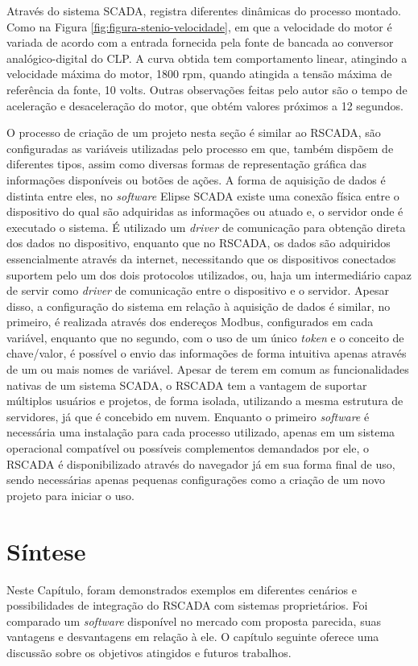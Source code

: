     	
Através do sistema \gls{SCADA},  registra diferentes dinâmicas do processo montado. Como na Figura \ref{fig:figura-stenio-velocidade}, em que a velocidade do motor é variada de acordo com a entrada fornecida pela fonte de bancada ao conversor analógico-digital do \gls{CLP}. A curva obtida tem comportamento linear, atingindo a velocidade máxima do motor,  1800 rpm, quando atingida a tensão máxima de referência da fonte, 10 volts. Outras observações feitas pelo autor são o tempo de aceleração e desaceleração do motor, que obtém valores próximos a 12 segundos.

O processo de criação de um projeto nesta seção é similar ao RSCADA, são configuradas as variáveis utilizadas pelo processo em que, também dispõem de diferentes tipos, assim como diversas formas de representação gráfica das informações disponíveis ou botões de ações. A forma de aquisição de dados é distinta entre eles, no \textit{software} Elipse \gls{SCADA} existe uma conexão física entre o dispositivo do qual são adquiridas as informações ou atuado e, o servidor onde é executado o sistema. É utilizado um \textit{driver} de comunicação para obtenção direta dos dados no dispositivo, enquanto que no RSCADA, os dados são adquiridos essencialmente através da internet, necessitando que os dispositivos conectados suportem pelo um dos dois protocolos utilizados, ou, haja um intermediário capaz de servir como \textit{driver} de comunicação entre o dispositivo e o servidor. Apesar disso, a configuração do sistema em relação à aquisição de dados é similar, no primeiro, é realizada através dos endereços Modbus, configurados em cada variável, enquanto que no segundo, com o uso de um único \textit{token} e o conceito de chave/valor, é possível o envio das informações de forma intuitiva apenas através de um ou mais nomes de variável. Apesar de terem em comum as funcionalidades nativas de um sistema \gls{SCADA}, o RSCADA tem a vantagem de suportar múltiplos usuários e projetos, de forma isolada, utilizando a mesma estrutura de servidores, já que é concebido em nuvem. Enquanto o primeiro \textit{software} é necessária uma instalação para cada processo utilizado, apenas em um sistema operacional compatível ou possíveis complementos demandados por ele, o RSCADA é disponibilizado através do navegador já em sua forma final de uso, sendo necessárias apenas pequenas configurações como a criação de um novo projeto para iniciar o uso.

\section{Síntese}
\label{sec:sintese-resultados}

Neste Capítulo, foram demonstrados exemplos em diferentes cenários e possibilidades de integração do RSCADA com sistemas proprietários. Foi comparado um \textit{software} disponível no mercado com proposta parecida, suas vantagens e desvantagens em relação à ele. O capítulo seguinte oferece uma discussão sobre os objetivos atingidos e futuros trabalhos.